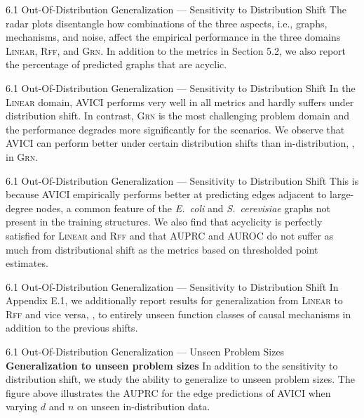 \documentclass[aspectratio=169,10pt]{beamer}
\newcommand{\domain}[1]{\textsc{#1}}
\newcommand{\lineardomain}{\domain{Linear}\xspace}
\newcommand{\rffdomain}{\domain{Rff}\xspace}
\newcommand{\grndomain}{\domain{Grn}\xspace}
\newcommand{\ood}{\text{o.o.d.}\xspace}
\newcommand{\ecoli}{{\em E.\ coli}\xspace}
\newcommand{\yeast}{{\em S.\ cerevisiae}\xspace}
\newcommand\erdosrenyi{\text{Erd{\H{o}}s-R{\'e}nyi}\xspace}
\newcommand{\ours}{AVICI\xspace}
\begin{document}
\begin{frame}{6.1 Out-Of-Distribution Generalization --- Sensitivity to Distribution Shift}
The radar plots disentangle how combinations of the three \ood aspects, i.e., graphs, mechanisms, and noise, affect the empirical performance in the three domains \lineardomain, \rffdomain, and \grndomain. In addition to the metrics in Section 5.2, we also report the percentage of predicted graphs that are acyclic.
\end{frame}

\begin{frame}{6.1 Out-Of-Distribution Generalization --- Sensitivity to Distribution Shift}
In the \lineardomain domain, \ours performs very well in all metrics and hardly suffers under distribution shift. In contrast, \grndomain is the most challenging problem domain and the performance degrades more significantly for the \ood scenarios. We observe that \ours can perform better under certain distribution shifts than in-distribution, \eg, in \grndomain.
\end{frame}

\begin{frame}{6.1 Out-Of-Distribution Generalization --- Sensitivity to Distribution Shift}
This is because \ours empirically performs better at predicting edges adjacent to large-degree nodes, a common feature of the \ecoli and \yeast graphs not present in the \erdosrenyi training structures. We also find that acyclicity is perfectly satisfied for \lineardomain and \rffdomain and that AUPRC and AUROC do not suffer as much from distributional shift as the metrics based on thresholded point estimates.
\end{frame}

\begin{frame}{6.1 Out-Of-Distribution Generalization --- Sensitivity to Distribution Shift}
In Appendix E.1, we additionally report results for generalization from \lineardomain to \rffdomain and vice versa, \ie, to entirely unseen function classes of causal mechanisms in addition to the previous \ood shifts.
\end{frame}

\begin{frame}{6.1 Out-Of-Distribution Generalization --- Unseen Problem Sizes}
\textbf{Generalization to unseen problem sizes}\quad
In addition to the sensitivity to distribution shift, we study the ability to generalize to unseen problem sizes. The figure above illustrates the AUPRC for the edge predictions of \ours when varying $d$ and $n$ on unseen in-distribution data.
\end{frame}
\end{document}
